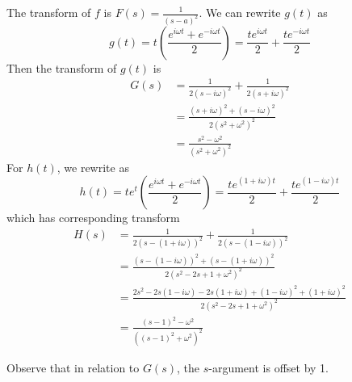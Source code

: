 \documentclass[a4paper]{article}
\begin{document}
The transform of \( f  \) is \( F \!\left( s  \right) = \displaystyle{\frac{1}{\!\left( s - a  \right)^{2}}} \). We can rewrite \( g \!\left( t  \right) \) as 
\[
	g \!\left( t  \right) = t \!\left( \frac{e^{i \omega t } + e^{-i \omega t }}{2} \right) = \frac{te^{i \omega t }}{2} + \frac{te^{-i \omega t }}{2}
\]
Then the transform of \( g \!\left( t  \right) \) is 
\begin{align*}
	G \!\left( s  \right) & = \frac{1}{2 \!\left( s - i \omega \right)^{2}} + \frac{1}{2 \!\left( s + i \omega \right)^{2}} \\
			      & = \frac{\!\left( s + i \omega \right)^{2} + \!\left( s - i \omega \right)^{2}}{2 \!\left( s^{2} + \omega^{2} \right)^{2}} \\
			      & = \frac{s^{2} - \omega^{2}}{\!\left( s^{2} + \omega^{2} \right)^{2}}
\end{align*}
For \( h \!\left( t  \right) \), we rewrite as 
\[
	h \!\left( t  \right) = te^{t } \!\left( \frac{e^{i \omega t } + e^{-i \omega t }}{2} \right) =  \frac{te^{\!\left( 1 + i \omega \right)t}}{2} + \frac{te^{\!\left( 1 - i \omega \right)t}}{2} 
\]
which has corresponding transform
\begin{align*}
	H \!\left( s  \right) & = \frac{1}{2 \!\left( s - \!\left( 1 + i \omega \right) \right)^{2}} + \frac{1}{2 \!\left( s - \!\left( 1 - i \omega \right) \right)^{2}} \\
			      & = \frac{\!\left( s - \!\left( 1 - i \omega \right) \right)^{2} + \!\left( s - \!\left( 1 + i \omega \right) \right)^{2}}{2 \!\left( s^{2} - 2s + 1 + \omega^{2} \right)^{2}} \\
			      & = \frac{2s^{2} - 2s \!\left( 1 - i \omega \right) - 2s \!\left( 1 + i \omega \right) + \!\left( 1 - i \omega \right)^{2} + \!\left( 1 + i \omega \right)^{2}}{2 \!\left( s^{2} - 2s + 1 + \omega^{2} \right)^{2}} \\
			      & = \frac{\!\left( s - 1 \right)^{2} - \omega^{2}}{\!\left( \!\left( s - 1 \right)^{2} + \omega^{2} \right)^{2}}
\end{align*}

Observe that in relation to \( G \!\left( s  \right) \), the \( s  \)-argument is offset by 1.

\vspace{12pt}

\end{document}
